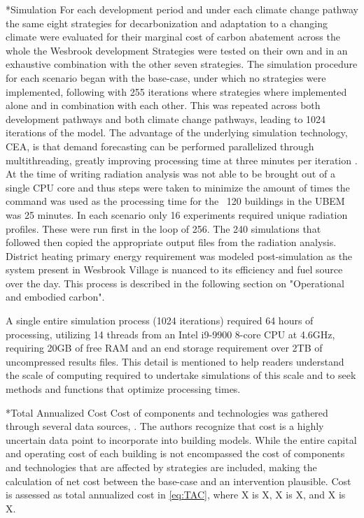 \documentclass[twocolumn, a4paper,10pt]{article}
\makeatletter
\renewcommand\subsection{\@startsection{subsection}{1}{\z@}{\z@}{\z@}{\normalfont\normalsize\bfseries}}
\renewcommand\subsection{\@startsection{subsection}{1}{\z@}{\z@}{0.1pt}{\normalfont\normalsize\bfseries}}
\makeatother
\begin{document}
\subsection*{Simulation}
For each development period and under each climate change pathway the same eight strategies for decarbonization and adaptation to a changing climate were evaluated for their marginal cost of carbon abatement across the whole the Wesbrook development Strategies were tested on their own and in an exhaustive combination with the other seven strategies. The simulation procedure for each scenario began with the base-case, under which no strategies were implemented, following with 255 iterations where strategies where implemented alone and in combination with each other. This was repeated across both development pathways and both climate change pathways, leading to 1024 iterations of the model. The advantage of the underlying simulation technology, CEA, is that demand forecasting can be performed parallelized through multithreading, greatly improving processing time at three minutes per iteration \citep{multithreading package}. At the time of writing radiation analysis was not able to be brought out of a single CPU core and thus steps were taken to minimize the amount of times the command was used as the processing time for the ~120 buildings in the UBEM was 25 minutes. In each scenario only 16 experiments required unique radiation profiles. These were run first in the loop of 256. The 240 simulations that followed then copied the appropriate output files from the radiation analysis. District heating primary energy requirement was modeled post-simulation as the system present in Wesbrook Village is nuanced to its efficiency and fuel source over the day. This process is described in the following section on "Operational and embodied carbon". 

A single entire simulation process (1024 iterations) required 64 hours of processing, utilizing 14 threads from an Intel i9-9900 8-core CPU at 4.6GHz, requiring 20GB of free RAM and an end storage requirement over 2TB of uncompressed results files. This detail is mentioned to help readers understand the scale of computing required to undertake simulations of this scale and to seek methods and functions that optimize processing times. 

\subsection*{Total Annualized Cost}
Cost of components and technologies was gathered through several data sources, \citep{data sources for cost}. The authors recognize that cost is a highly uncertain data point to incorporate into building models. While the entire capital and operating cost of each building is not encompassed the cost of components and technologies that are affected by strategies are included, making the calculation of net cost between the base-case and an intervention plausible. Cost is assessed as total annualized cost in \ref{eq:TAC}, where X is X, X is X, and X is X.
\end{document}
